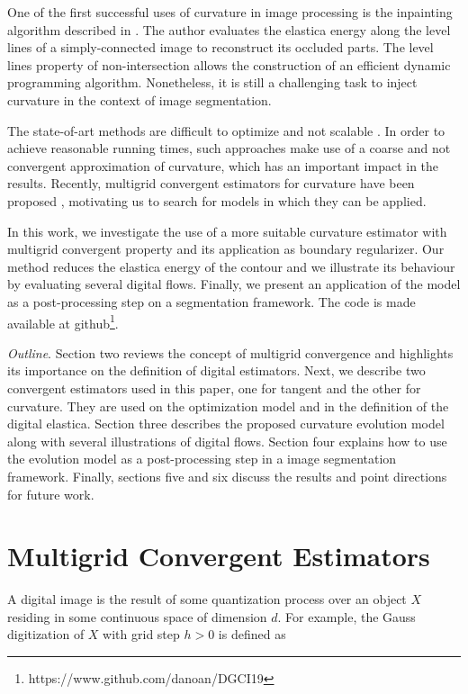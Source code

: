 \documentclass[runningheads]{llncs}
\begin{document}
One of the first successful uses of curvature in image processing is the inpainting algorithm described in \cite{masnou98}. The author evaluates the elastica energy along the level lines of a simply-connected image to reconstruct its occluded parts. The level lines property of non-intersection allows the construction of an efficient dynamic programming algorithm. Nonetheless, it is still a challenging task to inject curvature in the context of image segmentation. 

The state-of-art methods are difficult to optimize and  not scalable \cite{zehiry10,schoenemann09,nieuwenhuis14}. In order to achieve reasonable running times, such approaches make use of a coarse and not convergent approximation of curvature, which has an important impact in the results. Recently, multigrid convergent estimators for curvature have been proposed \cite{schindele17,coeurjolly13,roussillon11}, motivating us to search for models in which they can be applied.

In this work, we investigate the use of a more suitable curvature estimator with multigrid convergent property and its application as boundary regularizer. Our method reduces the elastica energy of the contour and we illustrate its behaviour by evaluating several digital flows. Finally, we present an application of the model as a post-processing step on a segmentation framework. The code is made available at github\footnote{https://www.github.com/danoan/DGCI19}.

\textit{Outline}. Section two reviews the concept of multigrid convergence and highlights its importance on the definition of digital estimators. Next, we describe two convergent estimators used in this paper, one for tangent and the other for curvature. They are used on the optimization model and in the definition of the digital elastica. Section three describes the proposed curvature evolution model along with several illustrations of digital flows. Section four explains how to use the evolution model as a post-processing step in a image segmentation framework. Finally, sections five and six discuss the results and point directions for future work.




\section{Multigrid Convergent Estimators}



A digital image is the result of some quantization process over an object $X$ residing in some continuous space of dimension $d$.  For example, the Gauss digitization of $X$ with grid step $h>0$ is defined as
\end{document}
